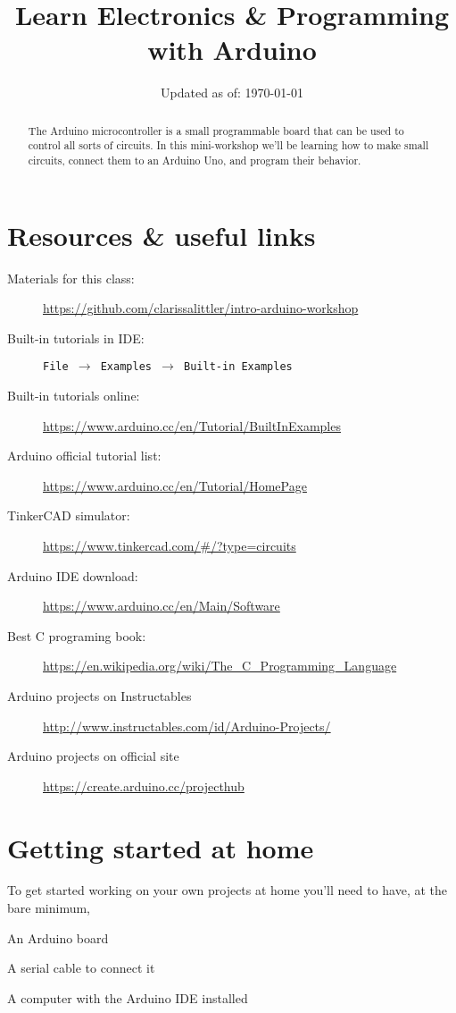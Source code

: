 \documentclass[letterpage,12pt]{article}
\title{Learn Electronics \& Programming with Arduino\vspace{-2ex}}
\date{Updated as of: \today\vspace{-2ex}}
\begin{document}
\maketitle
\begin{abstract}
  The Arduino microcontroller is a small programmable board that can be used to control all sorts of circuits. In this mini-workshop we'll be learning how to make small circuits, connect them to an Arduino Uno, and program their behavior.
\end{abstract}

\section*{Resources \& useful links}
\begin{description}
  \item[Materials for this class:] \url{https://github.com/clarissalittler/intro-arduino-workshop}
  \item[Built-in tutorials in IDE:] \texttt{File $\rightarrow$ Examples $\rightarrow$ Built-in Examples}
  \item[Built-in tutorials online:] \url{https://www.arduino.cc/en/Tutorial/BuiltInExamples}
  \item[Arduino official tutorial list:] \url{https://www.arduino.cc/en/Tutorial/HomePage}
  \item[TinkerCAD simulator:] \url{https://www.tinkercad.com/#/?type=circuits}
  \item[Arduino IDE download:] \url{https://www.arduino.cc/en/Main/Software}
  \item[Best C programing book:] \url{https://en.wikipedia.org/wiki/The_C_Programming_Language}
  \item[Arduino projects on Instructables] \url{http://www.instructables.com/id/Arduino-Projects/}
  \item[Arduino projects on official site] \url{https://create.arduino.cc/projecthub}
\end{description}

\section*{Getting started at home}
To get started working on your own projects at home you'll need to have, at the bare minimum,
\begin{enumerate*}
  \item An Arduino board
  \item A serial cable to connect it
  \item A computer with the Arduino IDE installed
\end{enumerate*}
\end{document}
